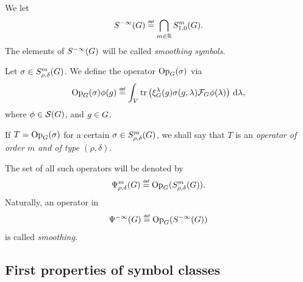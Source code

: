\begin{definition}
\label{definition:smoothing_symbols}
    We let
    \begin{align*}
        \SmoothingSymbols \defeq \bigcap_{m \in \R} \SymbolClass{m}{1, 0}.
    \end{align*}
    The elements of ${S^{-\infty} (G)}$ will be called \emph{smoothing symbols}.
\end{definition}

\begin{definition}
\label{definition:operator_classes}
    Let $\sigma \in S^{m}_{\rho, \delta}(G)$.
    We define the operator $\mathrm{Op}_{G}(\sigma)$ via
    \begin{align*}
        \Op(\sigma) \phi(g) \defeq
        \int_\VectorSpace
            \tr\left(\Rep\lambda(g) \sigma(g, \lambda) \Fourier \phi(\lambda)\right)
        \dd \lambda,
    \end{align*}
    where $\phi \in {\mathcal{S} (G)}$, and $g \in G$.


    If $T = \mathrm{Op}_{G}(\sigma)$ for a certain $\sigma \in S^{m}_{\rho, \delta}(G)$,
    we shall say that $T$ is an \emph{operator of order $m$ and of type $(\rho, \delta)$}.

    The set of all such operators will be denoted by
    \begin{align*}
        \OperatorClass{m}{\rho, \delta} \defeq \Op(\SymbolClass{m}{\rho, \delta}).
    \end{align*}
    Naturally, an operator in
    \begin{align*}
        \SmoothingOperators \defeq \Op(\SmoothingSymbols)
    \end{align*}
    is called \emph{smoothing}.
\end{definition}

\subsection{First properties of symbol classes}

